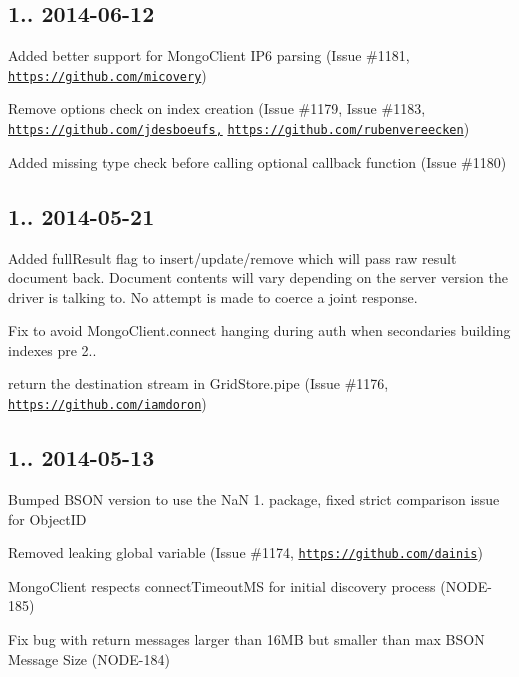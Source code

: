 \subsection*{1.. 2014-\/06-\/12 }


\begin{DoxyItemize}
\item Added better support for Mongo\+Client I\+P6 parsing (Issue \#1181, \href{https://github.com/micovery}{\tt https\+://github.\+com/micovery})
\item Remove options check on index creation (Issue \#1179, Issue \#1183, \href{https://github.com/jdesboeufs,}{\tt https\+://github.\+com/jdesboeufs,} \href{https://github.com/rubenvereecken}{\tt https\+://github.\+com/rubenvereecken})
\item Added missing type check before calling optional callback function (Issue \#1180)
\end{DoxyItemize}

\subsection*{1.. 2014-\/05-\/21 }


\begin{DoxyItemize}
\item Added full\+Result flag to insert/update/remove which will pass raw result document back. Document contents will vary depending on the server version the driver is talking to. No attempt is made to coerce a joint response.
\item Fix to avoid Mongo\+Client.\+connect hanging during auth when secondaries building indexes pre 2..
\item return the destination stream in Grid\+Store.\+pipe (Issue \#1176, \href{https://github.com/iamdoron}{\tt https\+://github.\+com/iamdoron})
\end{DoxyItemize}

\subsection*{1.. 2014-\/05-\/13 }


\begin{DoxyItemize}
\item Bumped B\+S\+ON version to use the NaN 1. package, fixed strict comparison issue for Object\+ID
\item Removed leaking global variable (Issue \#1174, \href{https://github.com/dainis}{\tt https\+://github.\+com/dainis})
\item Mongo\+Client respects connect\+Timeout\+MS for initial discovery process (N\+O\+D\+E-\/185)
\item Fix bug with return messages larger than 16\+MB but smaller than max B\+S\+ON Message Size (N\+O\+D\+E-\/184)
\end{DoxyItemize}

